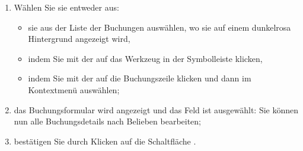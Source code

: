 \begin{enumerate}
	\item Wählen Sie sie entweder aus:
	\begin{itemize}
		\item sie aus der Liste der Buchungen auswählen, wo sie auf einem \colorbox[RGB]{245,155,155}{dunkelrosa Hintergrund} angezeigt wird,
		\item indem Sie mit der  auf das Werkzeug  in der Symbolleiste klicken,
		\item indem Sie mit der  auf die Buchungszeile klicken und dann im Kontextmenü  auswählen;
	\end{itemize}
	\item das Buchungsformular wird angezeigt und das Feld  ist ausgewählt: Sie können nun alle Buchungsdetails nach Belieben bearbeiten;
	\item bestätigen Sie durch Klicken auf die Schaltfläche .
\end{enumerate}


